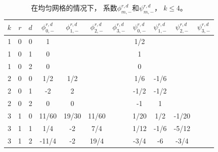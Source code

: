 \begin{table}[htbp]
  \caption{在均匀网格的情况下，
    系数$\phi_{m,-}^{r,d}$和$\psi_{m,-}^{r,d}$，
    $k \le 4$。
  }
  \label{ta:Con}
  \centering
  \begin{tabular}{ccc cccc cccc}
    \toprule
    $k$ & $r$ & $d$ & $\phi_{0,-}^{r,d}$ & $\phi_{1,-}^{r,d}$ & $\phi_{2,-}^{r,d}$ & $\phi_{3,-}^{r,d}$ & $\psi_{0,-}^{r,d}$ & $\psi_{1,-}^{r,d}$ & $\psi_{2,-}^{r,d}$ & $\psi_{3,-}^{r,d}$ \\
    \midrule
    1   & 0   & 0   & 1                  & ~                  & ~                  & ~                  & 1/2                & ~                  & ~                  & ~                  \\
    1   & 0   & 1   & 0                  & ~                  & ~                  & ~                  & 1                  & ~                  & ~                  & ~                  \\
    1   & 0   & 2   & 0                  & ~                  & ~                  & ~                  & 0                  & ~                  & ~                  & ~                  \\
    2   & 0   & 0   & 1/2                & 1/2                & ~                  & ~                  & 1/6                & -1/6               & ~                  & ~                  \\
    2   & 0   & 1   & -2                 & 2                  & ~                  & ~                  & -1/2               & -1/2               & ~                  & ~                  \\
    2   & 0   & 2   & 0                  & 0                  & ~                  & ~                  & -1                 & 1                  & ~                  & ~                  \\
    3   & 1   & 0   & 11/60              & 19/30              & 11/60              & ~                  & 1/20               & 1/2                & -1/20              & ~                  \\
    3   & 1   & 1   & 1/4                & -2                 & 7/4                & ~                  & 1/12               & -1/6               & -5/12              & ~                  \\
    3   & 1   & 2   & -11/4              & -2                 & 19/4               & ~                  & -3/4               & -6                 & -3/4               & ~                  \\

\end{tabular}
\end{table}
